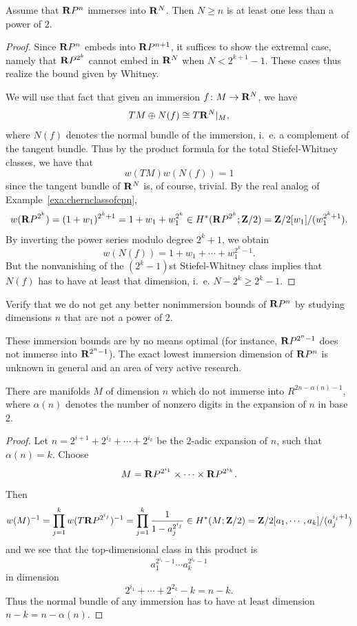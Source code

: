 \documentclass[a4paper,openany]{scrbook}
\begin{document}
\begin{thm}
Assume that $\mathbf R P^n$ immerses into $\mathbf R^N$. Then $N\geq n$ is at least one less than a power of $2$.
\end{thm}
\begin{proof}
Since $\mathbf R P^n$ embeds into $\mathbf R P^{n+1}$, it suffices to show the extremal case, namely that $\mathbf R P^{2^k}$ cannot embed in $\mathbf R^N$ when $N<2^{k+1}-1$. These cases thus realize the bound given by Whitney.

We will use that fact that given an immersion $f\colon M \to \mathbf R^N$, we have
\[
TM \oplus N(f) \cong T\mathbf R^N|_M,
\]
where $N(f)$ denotes the normal bundle of the immersion, i.~e. a complement of the tangent bundle. Thus by the product formula for the total Stiefel-Whitney classes, we have that
\[
w(TM) w(N(f)) = 1
\]
since the tangent bundle of $\mathbf R^N$ is, of course, trivial. By the real analog of Example~\ref{exa:chernclassofcpn},
\[
w(\mathbf R P^{2^k}) = (1+w_1)^{2^k+1} = 1+w_1+w_1^{2^k} \in H^*(\mathbf R P^{2^k};\mathbf Z/2) = \mathbf Z/2[w_1]/(w_1^{2^k+1}).
\]
By inverting the power series modulo degree $2^k+1$, we obtain
\[
w(N(f)) = 1+w_1+\cdots+w_1^{2^k-1}.
\]
But the nonvanishing of the $(2^k-1)$st Stiefel-Whitney class implies that $N(f)$ has to have at least that dimension, i.~e. $N-2^k \geq 2^k-1$.
\end{proof}

\begin{exer}\label{exer:nobetternonimmersion}
Verify that we do not get any better nonimmersion bounds of $\mathbf R P^n$ by studying dimensions $n$ that are not a power of $2$.
\end{exer}

These immersion bounds are by no means optimal (for instance, $\mathbf R P^{2^n-1}$ does not immerse into $\mathbf R^{2^n-1}$). The exact lowest immersion dimension of $\mathbf R P^n$ is unknown in general and an area of very active research.

\begin{thm}
There are manifolds $M$ of dimension $n$ which do not immerse into $R^{2n-\alpha(n)-1}$, where $\alpha(n)$ denotes the number of nonzero digits in the expansion of $n$ in base $2$.
\end{thm}
\begin{proof}
Let $n=2^{i+1}+2^{i_2}+\cdots+2^{i_k}$ be the $2$-adic expansion of $n$, such that $\alpha(n)=k$. Choose
\[
M= \mathbf R P^{2^{i_1}} \times \cdots \times \mathbf R P^{2^{i_k}}.
\]
Then
\[
w(M)^{-1} = \prod_{j=1}^k w(T\mathbf R P^{2^{i_j}})^{-1} = \prod_{j=1}^k \frac1{1-a_j^{2^{i_j}}} \in H^*(M;\mathbf Z/2) = \mathbf Z/2[a_1,\cdots,a_k]/(a_j^{i_j+1})
\]
and we see that the top-dimensional class in this product is
\[
a_1^{2^{i_1}-1}\cdots a_k^{2^{i_k}-1}
\]
in dimension
\[
2^{i_1}+\cdots+2^{2_k}-k = n-k.
\]
Thus the normal bundle of any immersion has to have at least dimension $n-k=n-\alpha(n)$.
\end{proof}
\end{document}
